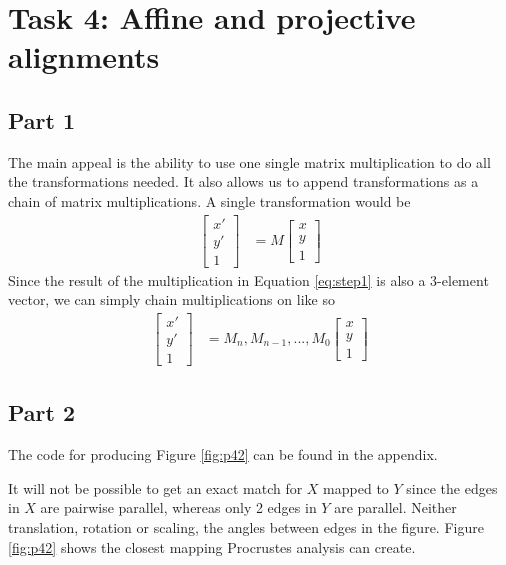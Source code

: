 \section{Task 4: Affine and projective alignments}

\subsection{Part 1}

The main appeal is the ability to use one single matrix multiplication to do all
the transformations needed. It also allows us to append transformations as a
chain of matrix multiplications.  A single transformation would be
\begin{align}
    \begin{bmatrix} x' \\ y' \\ 1 \end{bmatrix} &=
      M \begin{bmatrix} x \\ y \\ 1 \end{bmatrix} \label{eq:step1}
\end{align}
Since the result of the multiplication in Equation \ref{eq:step1} is also a
3-element vector, we can simply chain multiplications on like so
\begin{align}
    \begin{bmatrix} x' \\ y' \\ 1 \end{bmatrix} &= 
      M_n, M_{n-1}, ..., M_0 \begin{bmatrix} x \\ y \\ 1 \end{bmatrix} \label{eq:step2}
\end{align}


\subsection{Part 2}

The code for producing Figure \ref{fig:p42} can be found in the appendix.


It will not be possible to get an exact match for $X$ mapped to $Y$ since the
edges in $X$ are pairwise parallel, whereas only 2 edges in $Y$ are
parallel. Neither translation, rotation or scaling, the angles between edges in the figure.
Figure \ref{fig:p42} shows the closest mapping Procrustes analysis can create.

